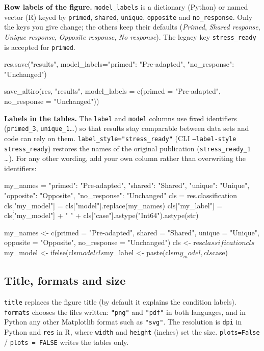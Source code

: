 \documentclass[11pt,a4paper]{article}
\newcommand{\code}[1]{\texttt{\color{navy!85!black}#1}}
\begin{document}
\textbf{Row labels of the figure.} \code{model\_labels} is a dictionary (Python) or named vector (R)
keyed by \code{primed}, \code{shared}, \code{unique}, \code{opposite} and \code{no\_response}. Only the
keys you give change; the others keep their defaults (\emph{Primed}, \emph{Shared response},
\emph{Unique response}, \emph{Opposite response}, \emph{No response}). The legacy key
\code{stress\_ready} is accepted for \code{primed}.

\begin{pycode}
res.save("results", model_labels={"primed": "Pre-adapted", "no_response": "Unchanged"})
\end{pycode}
\begin{rcode}
save_altiro(res, "results",
            model_labels = c(primed = "Pre-adapted", no_response = "Unchanged"))
\end{rcode}

\textbf{Labels in the tables.} The \code{label} and \code{model} columns use fixed identifiers
(\code{primed\_3}, \code{unique\_1}\ldots) so that results stay comparable between data sets and
code can rely on them. \code{label\_style="stress\_ready"} (CLI \code{--label-style stress\_ready})
restores the names of the original publication (\code{stress\_ready\_1} \ldots). For any other
wording, add your own column rather than overwriting the identifiers:

\begin{pycode}
my_names = {"primed": "Pre-adapted", "shared": "Shared", "unique": "Unique",
         "opposite": "Opposite", "no_response": "Unchanged"}
cls = res.classification
cls["my_model"] = cls["model"].replace(my_names)
cls["my_label"] = cls["my_model"] + " " + cls["case"].astype("Int64").astype(str)
\end{pycode}
\begin{rcode}
my_names <- c(primed = "Pre-adapted", shared = "Shared", unique = "Unique",
           opposite = "Opposite", no_response = "Unchanged")
cls <- res$classification
cls$my_model <- ifelse(cls$model %
cls$my_label <- paste(cls$my_model, cls$case)
\end{rcode}

\subsection{Title, formats and size}

\code{title} replaces the figure title (by default it explains the condition labels). \code{formats}
chooses the files written: \code{"png"} and \code{"pdf"} in both languages, and in Python any other
Matplotlib format such as \code{"svg"}. The resolution is
\code{dpi} in Python and \code{res} in R, where \code{width} and \code{height} (inches) set the size.
\code{plots=False} / \code{plots = FALSE} writes the tables only.
\end{document}
